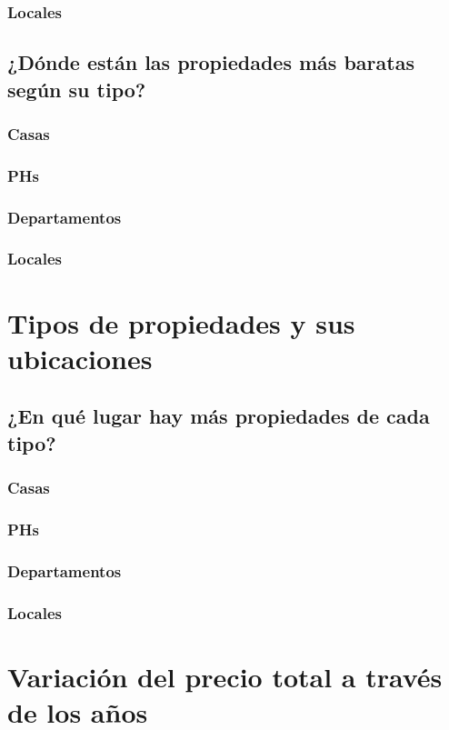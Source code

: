 \documentclass[a4paper, 10pt]{article}
\begin{document}
				\subsubsection{Locales}
			\subsection{¿Dónde están las propiedades más baratas según su tipo?}
				\subsubsection{Casas}
				\subsubsection{PHs}
				\subsubsection{Departamentos}
				\subsubsection{Locales}
		\section{Tipos de propiedades y sus ubicaciones}
			\subsection{¿En qué lugar hay más propiedades de cada tipo?}
				\subsubsection{Casas}
				\subsubsection{PHs}
				\subsubsection{Departamentos}
				\subsubsection{Locales}
		\section{Variación del precio total a través de los años}
\end{document}
